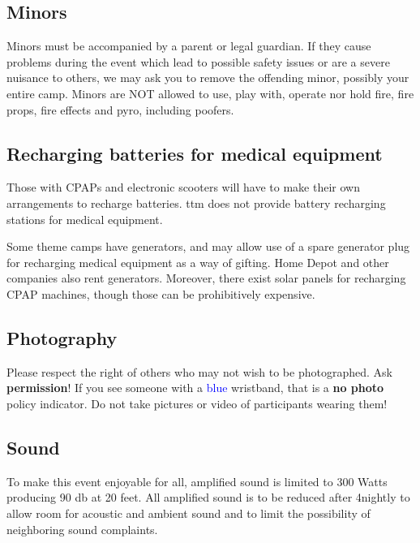 
\subsection*{Minors}
Minors must be accompanied by a parent or legal guardian. If they cause problems during the event which lead to possible safety issues or are a severe nuisance to others, we may ask you to remove the offending minor, possibly your entire camp. Minors are NOT allowed to use, play with, operate nor hold fire, fire props, fire effects and pyro, including poofers.  


\subsection*{Recharging batteries for medical equipment}
Those with CPAPs and electronic scooters will have to make their own arrangements to recharge batteries.  \gls{ttm} does not provide battery recharging stations for medical equipment.

Some theme camps have generators, and may allow use of a spare generator plug for recharging medical equipment as a way of \gls{gifting}.  Home Depot and other companies also rent generators.  Moreover, there exist solar panels for recharging CPAP machines, though those can be prohibitively expensive.

\subsection*{Photography}
Please respect the right of others who may not wish to be photographed. Ask \textbf{permission}! If you see someone with a \textcolor{blue}{blue} wristband, that is a \textbf{no photo} policy indicator. 
Do not take pictures or video of participants wearing them! 

\subsection*{Sound}
To make this event enjoyable for all, amplified sound is limited to 300 Watts producing 90 db at 20 feet. All amplified sound is to be reduced after 4\am nightly to allow room for acoustic and ambient sound and to limit the possibility of neighboring sound complaints. 

